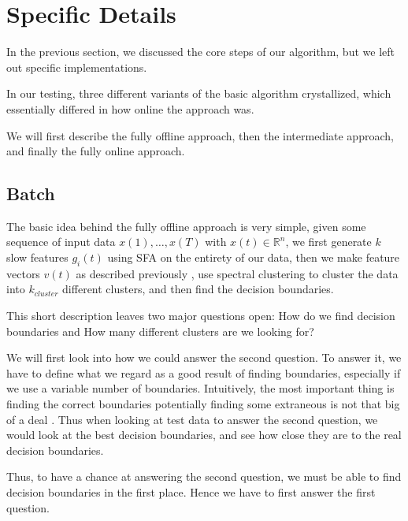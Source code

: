 \section{Specific Details}
In the previous section, we discussed the core steps of our algorithm, but we left out specific implementations. 

In our testing, three different variants of the basic algorithm crystallized, which essentially differed in how online the approach was.

We will first describe the fully offline approach, then the intermediate approach, and finally the fully online approach.
\subsection{Batch}
The basic idea behind the fully offline approach is very simple, given some sequence of input data $x(1), \ldots, x(T)$ with $x(t) \in \mathbb{R}^n$, we first generate $k$ slow features $g_i(t)$ using SFA on the entirety of our data, then we make feature vectors $v(t)$ as described previously , use spectral clustering to cluster the data into $k_{cluster}$ different clusters, and then find the decision boundaries.

This short description leaves two major questions open: How do we find decision boundaries and How many different clusters are we looking for?

We will first look into how we could answer the second question. To answer it, we have to define what we regard as a good result of finding boundaries, especially if we use a variable number of boundaries. Intuitively, the most important thing is finding the correct boundaries potentially finding some extraneous  is not that big of a deal . Thus when looking at test data to answer the second question, we would look at the best decision boundaries, and see how close they are to the real decision boundaries.

Thus, to have a chance at answering the second question, we must be able to find decision boundaries in the first place. Hence we have to first answer the first question.


